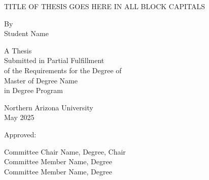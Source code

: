 \begin{titlepage}
\thispagestyle{empty}

\begin{center}

\vspace*{1in}

{\MakeUppercase{TITLE OF THESIS GOES HERE IN ALL BLOCK CAPITALS}}\\
\vspace{2\baselineskip}

By\\
\vspace{\baselineskip}
Student Name\\

\vspace{2\baselineskip}

A Thesis\\
Submitted in Partial Fulfillment\\
of the Requirements for the Degree of\\
Master of Degree Name\\
in Degree Program\\

\vspace{2\baselineskip}

Northern Arizona University\\
May 2025\\

\vfill

Approved:\\
\vspace{\baselineskip}

Committee Chair Name, Degree, Chair\\
Committee Member Name, Degree\\
Committee Member Name, Degree\\

\end{center}

\end{titlepage}
